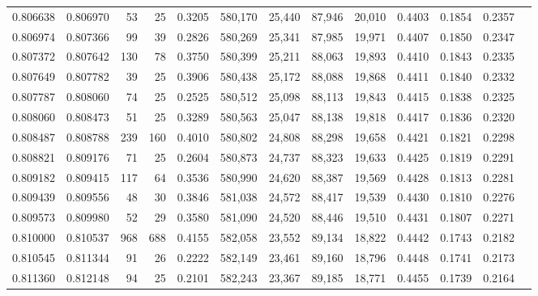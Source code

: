 \begin{tabular}{rrrrrrrrrrrrr}
0.806638 & 0.806970 &    53 &  25 &                                     0.3205 & 580,170 &  25,440 &  87,946 &  20,010 & 0.4403 & 0.1854 & 0.2357 \\
0.806974 & 0.807366 &    99 &  39 &                                     0.2826 & 580,269 &  25,341 &  87,985 &  19,971 & 0.4407 & 0.1850 & 0.2347 \\
0.807372 & 0.807642 &   130 &  78 &                                     0.3750 & 580,399 &  25,211 &  88,063 &  19,893 & 0.4410 & 0.1843 & 0.2335 \\
0.807649 & 0.807782 &    39 &  25 &                                     0.3906 & 580,438 &  25,172 &  88,088 &  19,868 & 0.4411 & 0.1840 & 0.2332 \\
0.807787 & 0.808060 &    74 &  25 &                                     0.2525 & 580,512 &  25,098 &  88,113 &  19,843 & 0.4415 & 0.1838 & 0.2325 \\
0.808060 & 0.808473 &    51 &  25 &                                     0.3289 & 580,563 &  25,047 &  88,138 &  19,818 & 0.4417 & 0.1836 & 0.2320 \\
0.808487 & 0.808788 &   239 & 160 &                                     0.4010 & 580,802 &  24,808 &  88,298 &  19,658 & 0.4421 & 0.1821 & 0.2298 \\
0.808821 & 0.809176 &    71 &  25 &                                     0.2604 & 580,873 &  24,737 &  88,323 &  19,633 & 0.4425 & 0.1819 & 0.2291 \\
0.809182 & 0.809415 &   117 &  64 &                                     0.3536 & 580,990 &  24,620 &  88,387 &  19,569 & 0.4428 & 0.1813 & 0.2281 \\
0.809439 & 0.809556 &    48 &  30 &                                     0.3846 & 581,038 &  24,572 &  88,417 &  19,539 & 0.4430 & 0.1810 & 0.2276 \\
0.809573 & 0.809980 &    52 &  29 &                                     0.3580 & 581,090 &  24,520 &  88,446 &  19,510 & 0.4431 & 0.1807 & 0.2271 \\
0.810000 & 0.810537 &   968 & 688 &                                     0.4155 & 582,058 &  23,552 &  89,134 &  18,822 & 0.4442 & 0.1743 & 0.2182 \\
0.810545 & 0.811344 &    91 &  26 &                                     0.2222 & 582,149 &  23,461 &  89,160 &  18,796 & 0.4448 & 0.1741 & 0.2173 \\
0.811360 & 0.812148 &    94 &  25 &                                     0.2101 & 582,243 &  23,367 &  89,185 &  18,771 & 0.4455 & 0.1739 & 0.2164 \\

\end{tabular}
